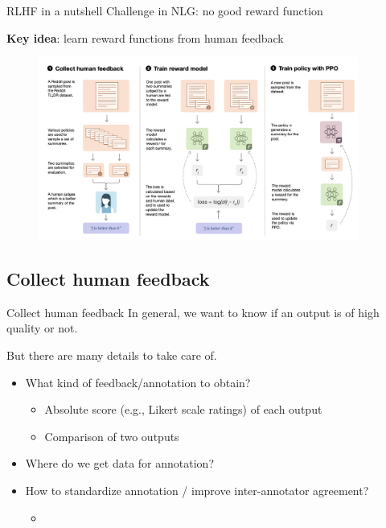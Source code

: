 \documentclass[usenames,dvipsnames,notes,11pt,aspectratio=169,hyperref={colorlinks=true, linkcolor=blue}]{beamer}
\begin{document}
\begin{frame}
    {RLHF in a nutshell}
        Challenge in NLG: no good reward function

        {\bf Key idea}: learn reward functions from human feedback

        \begin{figure}
            \includegraphics[height=6cm]{figures/rlhf}
        \end{figure}
\end{frame}

\subsection{Collect human feedback}
\begin{frame}
    {Collect human feedback}
    In general, we want to know if an output is of high quality or not.

    But there are many details to take care of. 
    \begin{itemize}
        \itemsep1em
        \item<1-> What kind of feedback/annotation to obtain?
            \begin{itemize}
                \item Absolute score (e.g., Likert scale ratings) of each output
                \item Comparison of two outputs
            \end{itemize}
        \item<2-> Where do we get data for annotation?
        \item<3-> How to standardize annotation / improve inter-annotator agreement?
            \begin{itemize}
                \item[] 
            \end{itemize}
    \end{itemize}
\end{frame}
\end{document}
